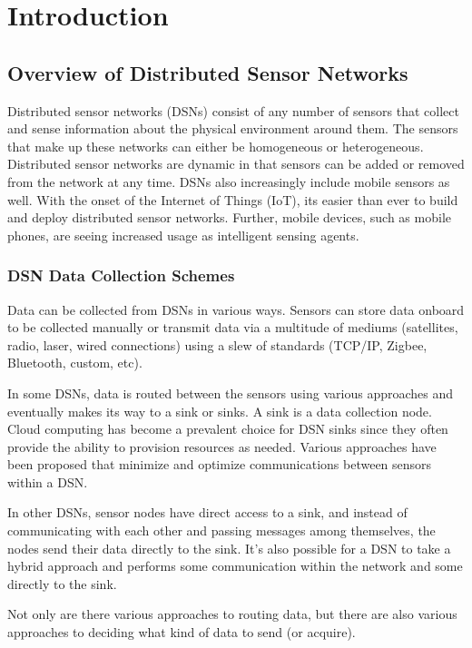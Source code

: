 \chapter{Introduction}

\section{Overview of Distributed Sensor Networks}
Distributed sensor networks (DSNs) consist of any number of sensors that collect and sense information about the physical environment around them. The sensors that make up these networks can either be homogeneous or heterogeneous. Distributed sensor networks are dynamic in that sensors can be added or removed from the network at any time. DSNs also increasingly include mobile sensors as well. With the onset of the Internet of Things (IoT), its easier than ever to build and deploy distributed sensor networks. Further, mobile devices, such as mobile phones, are seeing increased usage as intelligent sensing agents.

\subsection{DSN Data Collection Schemes}
Data can be collected from DSNs in various ways. Sensors can store data onboard to be collected manually or transmit data via a multitude of mediums (satellites, radio, laser, wired connections) using a slew of standards (TCP/IP, Zigbee, Bluetooth, custom, etc).

In some DSNs, data is routed between the sensors using various approaches and eventually makes its way to a sink or sinks. A sink is a data collection node. Cloud computing has become a prevalent choice for DSN sinks since they often provide the ability to provision resources as needed. Various approaches have been proposed that minimize and optimize communications between sensors within a DSN.

In other DSNs, sensor nodes have direct access to a sink, and instead of communicating with each other and passing messages among themselves, the nodes send their data directly to the sink. It's also possible for a DSN to take a hybrid approach and performs some communication within the network and some directly to the sink.

Not only are there various approaches to routing data, but there are also various approaches to deciding what kind of data to send (or acquire).


